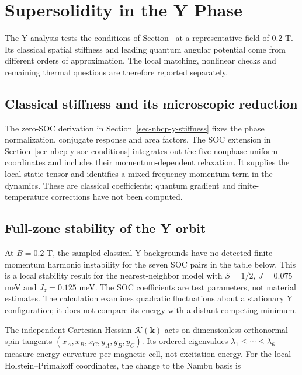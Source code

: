 \clearpage

\section{Supersolidity in the Y Phase}\label{sec-nbcp-y-phase}

The Y analysis tests the conditions of
Section~ at a representative field of
0.2 T. Its classical spatial stiffness and leading quantum angular
potential come from different orders of approximation. The local
matching, nonlinear checks and remaining thermal questions are therefore
reported separately.

\subsection{Classical stiffness and its microscopic
reduction}\label{classical-stiffness-and-its-microscopic-reduction}

The zero-SOC derivation in Section~\ref{sec-nbcp-y-stiffness} fixes the
phase normalization, conjugate response and area factors. The SOC
extension in Section~\ref{sec-nbcp-y-soc-conditions} integrates out the
five nonphase uniform coordinates and includes their momentum-dependent
relaxation. It supplies the local static tensor and identifies a mixed
frequency-momentum term in the dynamics. These are classical
coefficients; quantum gradient and finite-temperature corrections have
not been computed.

\subsection{Full-zone stability of the Y
orbit}\label{sec-nbcp-y-full-zone-stability}

At \(B=0.2\) T, the sampled classical Y backgrounds have no detected
finite-momentum harmonic instability for the seven SOC pairs in the
table below. This is a local stability result for the nearest-neighbor
model with \(S=1/2\), \(J=0.075\) meV and \(J_z=0.125\) meV. The SOC
coefficients are test parameters, not material estimates. The
calculation examines quadratic fluctuations about a stationary Y
configuration; it does not compare its energy with a distant competing
minimum.

The independent Cartesian Hessian \(\mathcal K(\mathbf k)\) acts on
dimensionless orthonormal spin tangents \((x_A,x_B,x_C,y_A,y_B,y_C)\).
Its ordered eigenvalues \(\lambda_1\leq\cdots\leq\lambda_6\) measure
energy curvature per magnetic cell, not excitation energy. For the local
Holstein--Primakoff coordinates, the change to the Nambu basis is


